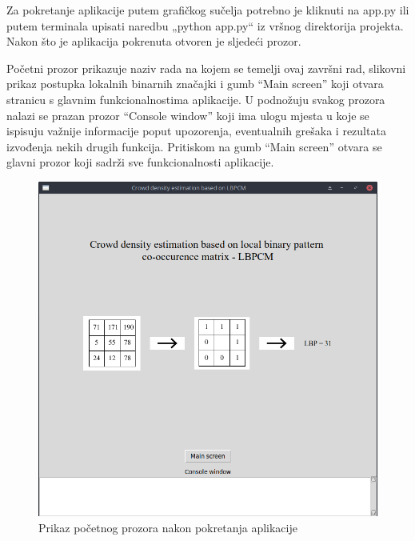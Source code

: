\documentclass[times, utf8, zavrsni, numeric]{fer}
\begin{document}
\bigbreak

Za pokretanje aplikacije putem grafičkog sučelja potrebno je kliknuti 
na app.py ili putem terminala upisati naredbu „python app.py“ iz 
vršnog direktorija projekta. Nakon što je aplikacija pokrenuta 
otvoren je sljedeći prozor. 

\bigbreak

Početni prozor prikazuje naziv rada \citep{6266412} na kojem se temelji ovaj završni rad, 
slikovni prikaz postupka lokalnih binarnih značajki i gumb \enquote{Main screen}
koji otvara stranicu s glavnim funkcionalnostima aplikacije. U podnožuju svakog
prozora nalazi se prazan prozor \enquote{Console window} koji ima ulogu
mjesta u koje se ispisuju važnije informacije poput upozorenja, eventualnih 
grešaka i rezultata izvođenja nekih drugih funkcija. Pritiskom na gumb \enquote{Main screen}
otvara se glavni prozor koji sadrži sve funkcionalnosti aplikacije.

\bigbreak

\begin{figure}[!ht]
\centering
\includegraphics[scale=0.37]{img/startpage.png}
\caption{Prikaz početnog prozora nakon pokretanja aplikacije}
\end{figure}

\hfill
\end{document}
